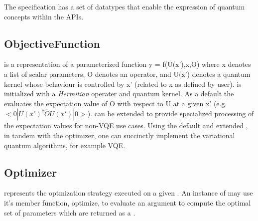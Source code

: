 The \qcor specification has a set of datatypes that enable the expression of quantum concepts within the \qcor \ac{API}s.\\

\subsection{\textbf{ObjectiveFunction}}\label{subsec:ObjectiveFunction}
 is a representation of a parameterized function y = f(U(x'),x,O)
where x denotes a list of scalar parameters, O denotes an operator, and U(x') denotes a quantum kernel whose behaviour is controlled by x' (related to x as defined by user).  is initialized with a {\em Hermitian} operater and quantum kernel. As a default the  evaluates the expectation value of O with respect to U at a given x' (e.g. $<0|U(x')^\dagger \hat{O} U(x')|0>$).  can be extended to provide specialized processing of the expectation values for non-VQE use cases. Using the default and extended , in tandem with the optimizer, one can succinctly implement the variational quantum algorithms, for example VQE.\\  

\subsection{\textbf{Optimizer}}\label{subsec:Optimizer}
 represents the optmization strategy executed on a given . An instance of  may use it's member function, optimize, to evaluate an  argument to compute the optimal set of parameters which are returned as a .\\


